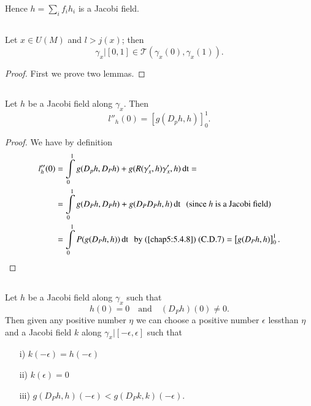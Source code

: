 Hence $h=\sum\limits_{i}f_{i}h_{i}$ is a Jacobi field.

\setcounter{subsection}{8}\label{chap8:8.2.9}
\subsection{}


\begin{prop*}
Let $x\in U(M)$ and $l>j(x)$; then 
$$
\gamma_{x}|[0,1]\in \mathscr{T}(\gamma_{x}(0), \gamma_{x}(1)).
$$
\end{prop*}

\begin{proof}
First we prove two lemmas.
\end{proof}

\setcounter{subsection}{9}

\subsection{}\label{chap8:8.2.10}

\begin{lemma*}
Let $h$ be a Jacobi field along $\gamma_{x}$. Then
$$
l''_{h}(0)=\left[g(D_{p}h,h)\right]^{1}_{0}.
$$
\end{lemma*}

\begin{proof}
We have by definition
\begin{align*}
l''_{h}(0) &=
\int\limits^{1}_{0}g(D_{p}h,D_{P}h)+g(R(\gamma'_{x},h)\gamma'_{x},h)\operatorname{dt}=\\
&= \int\limits^{1}_{0}g(D_{P}h,D_{P}h)+g(D_{P}D_{P}h,h)\operatorname{dt}\text{
  \ (since $h$ is a Jacobi field)}\\
&= \int\limits^{1}_{0}P(g(D_{P}h,h))\operatorname{dt}\text{ \ by (\ref{chap5:5.4.8}) (C.D.7)}
=\left[g(D_{P}h,h)\right]^{1}_{0}. 
\end{align*}
\end{proof}

\subsection{}\label{chap8:8.2.11}

\begin{lemma*}
Let $h$ be a Jacobi field along $\gamma_{x}$ such that
$$
h(0)=0\quad\text{and}\quad (D_{P}h)(0)\neq 0.
$$
Then given any positive number $\eta$ we can choose a positive number
$\epsilon$ less\pageoriginale than $\eta$ and a Jacobi field $k$ along
$\gamma_{x}|[-\epsilon,\epsilon]$ such that
\begin{itemize}
\item[\rm i)] $k(-\epsilon)=h(-\epsilon)$

\item[\rm ii)] $k(\epsilon)=0$

\item[\rm iii)] $g(D_{P}h,h)(-\epsilon)<g(D_{P}k,k)(-\epsilon)$.
\end{itemize}
\end{lemma*}

